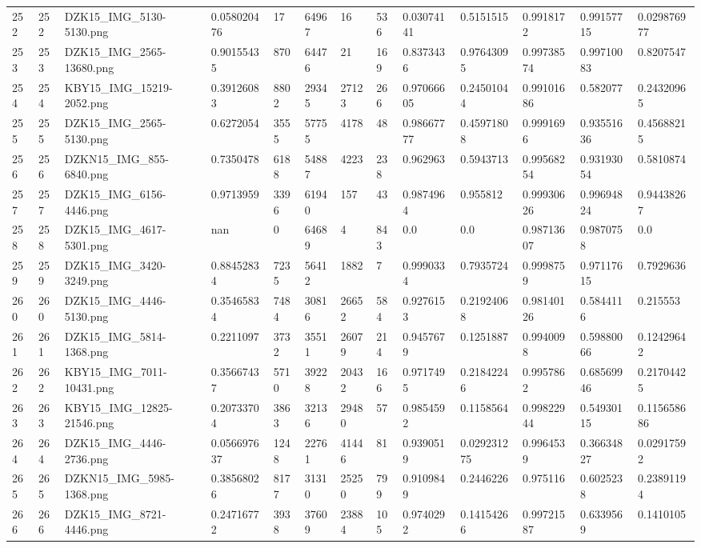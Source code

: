 \documentclass[11pt, a4paper, twoside]{report}
\begin{document}
\begin{longtable}[c]{@{}lllllllllllll@{}}
252 & 252 & DZK15\_IMG\_5130-5130.png & 0.058020476 & 17 & 64967 & 16 & 536 & 0.03074141 & 0.5151515 & 0.9918172 & 0.99157715 & 0.029876977 \\
253 & 253 & DZK15\_IMG\_2565-13680.png & 0.90155435 & 870 & 64476 & 21 & 169 & 0.8373436 & 0.97643095 & 0.99738574 & 0.99710083 & 0.8207547 \\
254 & 254 & KBY15\_IMG\_15219-2052.png & 0.39126083 & 8802 & 29345 & 27123 & 266 & 0.97066605 & 0.24501044 & 0.99101686 & 0.582077 & 0.24320965 \\
255 & 255 & DZK15\_IMG\_2565-5130.png & 0.6272054 & 3555 & 57755 & 4178 & 48 & 0.98667777 & 0.45971808 & 0.9991696 & 0.93551636 & 0.45688215 \\
256 & 256 & DZKN15\_IMG\_855-6840.png & 0.7350478 & 6188 & 54887 & 4223 & 238 & 0.962963 & 0.5943713 & 0.99568254 & 0.93193054 & 0.5810874 \\
257 & 257 & DZK15\_IMG\_6156-4446.png & 0.9713959 & 3396 & 61940 & 157 & 43 & 0.9874964 & 0.955812 & 0.99930626 & 0.99694824 & 0.94438267 \\
258 & 258 & DZK15\_IMG\_4617-5301.png & nan & 0 & 64689 & 4 & 843 & 0.0 & 0.0 & 0.98713607 & 0.9870758 & 0.0 \\
259 & 259 & DZK15\_IMG\_3420-3249.png & 0.88452834 & 7235 & 56412 & 1882 & 7 & 0.9990334 & 0.7935724 & 0.9998759 & 0.97117615 & 0.7929636 \\
260 & 260 & DZK15\_IMG\_4446-5130.png & 0.35465834 & 7484 & 30816 & 26652 & 584 & 0.9276153 & 0.21924068 & 0.98140126 & 0.5844116 & 0.215553 \\
261 & 261 & DZK15\_IMG\_5814-1368.png & 0.2211097 & 3732 & 35511 & 26079 & 214 & 0.9457679 & 0.1251887 & 0.9940098 & 0.59880066 & 0.12429642 \\
262 & 262 & KBY15\_IMG\_7011-10431.png & 0.35667437 & 5710 & 39228 & 20432 & 166 & 0.9717495 & 0.21842246 & 0.9957862 & 0.68569946 & 0.21704425 \\
263 & 263 & KBY15\_IMG\_12825-21546.png & 0.20733704 & 3863 & 32136 & 29480 & 57 & 0.9854592 & 0.1158564 & 0.99822944 & 0.54930115 & 0.115658686 \\
264 & 264 & DZK15\_IMG\_4446-2736.png & 0.056697637 & 1248 & 22761 & 41446 & 81 & 0.9390519 & 0.029231275 & 0.9964539 & 0.36634827 & 0.02917592 \\
265 & 265 & DZKN15\_IMG\_5985-1368.png & 0.38568026 & 8177 & 31310 & 25250 & 799 & 0.9109849 & 0.2446226 & 0.975116 & 0.6025238 & 0.23891194 \\
266 & 266 & DZK15\_IMG\_8721-4446.png & 0.24716772 & 3938 & 37609 & 23884 & 105 & 0.9740292 & 0.14154266 & 0.99721587 & 0.6339569 & 0.1410105 \\

\end{longtable}
\end{document}
